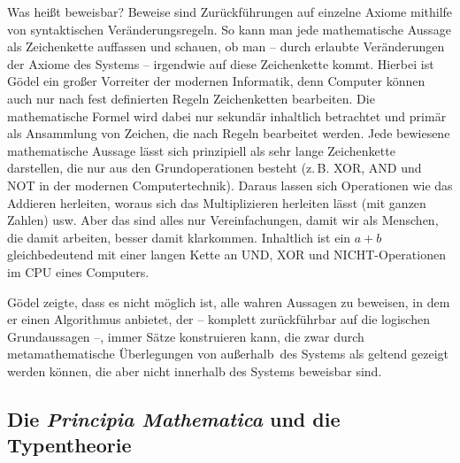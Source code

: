 Was heißt \frq beweisbar\flq? Beweise sind Zurückführungen auf einzelne Axiome mithilfe
von syntaktischen Veränderungsregeln.
So kann man jede mathematische Aussage als Zeichenkette
auffassen und schauen, ob man -- durch erlaubte Veränderungen der Axiome des Systems --
irgendwie auf diese Zeichenkette kommt. Hierbei ist Gödel ein großer Vorreiter der
modernen Informatik, denn Computer können auch nur nach fest definierten Regeln
Zeichenketten bearbeiten. Die mathematische Formel wird dabei nur sekundär
inhaltlich
betrachtet und primär als Ansammlung von Zeichen, die nach Regeln bearbeitet werden.
Jede bewiesene mathematische Aussage lässt sich prinzipiell als sehr lange Zeichenkette
darstellen, die nur aus den Grundoperationen besteht (z.\,B. XOR, AND und NOT in
der modernen Computertechnik). Daraus lassen sich Operationen wie das Addieren
herleiten, woraus sich das Multiplizieren herleiten lässt (mit ganzen Zahlen) usw.
Aber das sind alles nur Vereinfachungen, damit wir als Menschen, die damit arbeiten,
besser damit klarkommen. Inhaltlich ist ein $a + b$ gleichbedeutend mit einer langen
Kette an UND, XOR und NICHT-Operationen im CPU eines Computers.

Gödel zeigte, dass es nicht möglich ist, alle wahren Aussagen zu beweisen,
in dem er einen Algorithmus anbietet, der -- komplett zurückführbar auf die logischen
Grundaussagen --, immer Sätze konstruieren kann, die zwar durch metamathematische
Überlegungen von \frq außerhalb\flq\ des Systems
als geltend gezeigt werden können, die aber nicht innerhalb des Systems beweisbar sind.

\subsection*{Die \textit{Principia Mathematica} und die Typentheorie}

